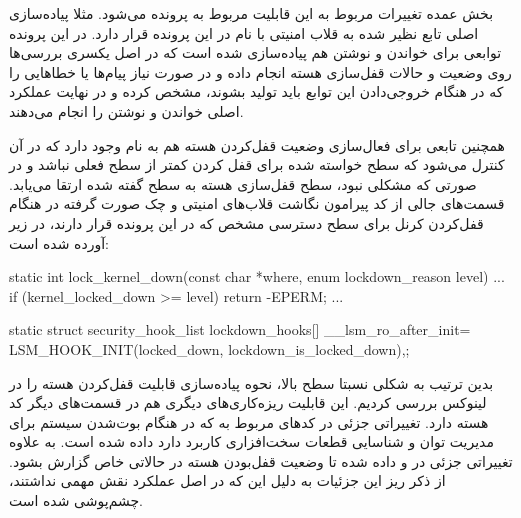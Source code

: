  بخش عمده تغییرات مربوط به این قابلیت مربوط به پرونده  می‌شود. مثلا پیاده‌سازی اصلی تابع نظیر شده به قلاب امنیتی
  با نام 
  در این پرونده قرار دارد. در این پرونده توابعی برای خواندن و نوشتن هم پیاده‌سازی شده است که در اصل یکسری بررسی‌ها روی وضعیت و حالات قفل‌سازی هسته انجام داده و در صورت نیاز پیام‌ها یا خطاهایی را که در هنگام خروجی‌دادن این توابع باید تولید بشوند، مشخص کرده و در نهایت عملکرد اصلی خواندن و نوشتن را انجام می‌دهند. \cite{linux}
  
  همچنین تابعی برای فعال‌سازی وضعیت قفل‌کردن هسته هم به نام 
  وجود دارد که در آن کنترل می‌شود که سطح خواسته شده  برای قفل کردن کمتر از سطح فعلی نباشد و در صورتی که مشکلی نبود، سطح قفل‌سازی هسته به سطح گفته شده ارتقا می‌یابد. قسمت‌های جالی از کد پیرامون نگاشت قلاب‌های امنیتی و چک صورت گرفته در هنگام قفل‌کردن کرنل برای سطح دسترسی مشخص که در این پرونده قرار دارند، در زیر آورده شده است:
  
  \begin{code}
 static int lock_kernel_down(const char *where, enum lockdown_reason level)
  { ...
  	if (kernel_locked_down >= level)
  		return -EPERM;
  ... }
  
	static struct security_hook_list lockdown_hooks[] __lsm_ro_after_init={
		LSM_HOOK_INIT(locked_down, lockdown_is_locked_down),};
  \end{code}

بدین ترتیب به شکلی نسبتا سطح بالا، نحوه پیاده‌سازی قابلیت قفل‌کردن هسته را در لینوکس بررسی کردیم. این قابلیت ریزه‌کاری‌های دیگری هم در قسمت‌های دیگر کد هسته دارد. تغییراتی جزئی در کدهای مربوط به 
که در هنگام بوت‌شدن سیستم برای مدیریت توان و شناسایی قطعات سخت‌افزاری کاربرد دارد داده شده است. به علاوه تغییراتی جزئی در 
و
داده شده تا وضعیت قفل‌بودن هسته در حالاتی خاص گزارش بشود. از ذکر ریز این جزئیات به دلیل این که در اصل عملکرد نقش مهمی نداشتند، چشم‌پوشی شده است. 
\cite{linux}